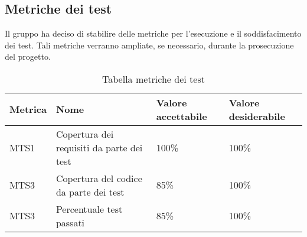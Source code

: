 \subsection{Metriche dei test}
Il gruppo ha deciso di stabilire delle metriche per l'esecuzione e il soddisfacimento dei test. Tali metriche verranno ampliate, se necessario, durante la prosecuzione del progetto.


{

\centering
\renewcommand{\arraystretch}{2}
\begin{longtable}{C{2cm} C{6.3cm} C{3cm} C{3cm}}
\caption{Tabella metriche dei test}\\
\textbf{Metrica} &
\textbf{Nome} &
\textbf{Valore accettabile}&
\textbf{Valore desiderabile}\\
\endhead


MTS1 & Copertura dei requisiti da parte dei test & 100\% & 100\%\\
MTS3 & Copertura del codice da parte dei test & 85\% & 100\%\\
MTS3 & Percentuale test passati & 85\% & 100\%\\


\end{longtable}
}
